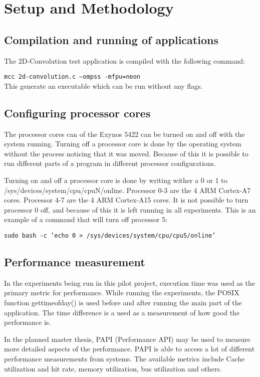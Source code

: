 \chapter[Setup and Methodology]{Setup and Methodology} \label{setupandmethodology}

\section{Compilation and running of applications}
The 2D-Convolution test application is compiled with the following command:

\texttt{mcc 2d-convolution.c --ompss -mfpu=neon}\\
This generate an executable which can be run without any flags.

\section{Configuring processor cores}
The processor cores can of the Exynos 5422 can be turned on and off with the system running.
Turning off a processor core is done by the operating system without the process noticing that it was moved.
Because of this it is possible to run different parts of a program in different processor configurations.

Turning on and off a processor core is done by writing wither a 0 or 1 to /sys/devices/system/cpu/cpuN/online.
Processor 0-3 are the 4 ARM Cortex-A7 cores.
Processor 4-7 are the 4 ARM Cortex-A15 cores.
It is not possible to turn processor 0 off, and because of this it is left running in all experiments.
This is an example of a command that will turn off processor 5:

\texttt{sudo bash -c 'echo 0 > /sys/devices/system/cpu/cpu5/online'}

\section{Performance measurement}
In the experiments being run in this pilot project, execution time was used as the primary metric for performance.
While running the experiments, the POSIX function gettimeofday() is used before and after running the main part of the application.
The time difference is a used as a measurement of how good the performance is.

In the planned master thesis, PAPI (Performance API) may be used to measure more detailed aspects of the performance.
PAPI is able to access a lot of different performance measurements from systems.
The available metrics include Cache utilization and hit rate, memory utilization, bus utilization and others.

